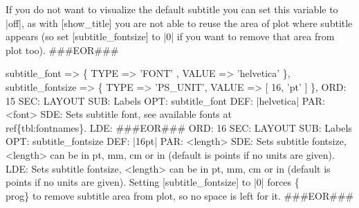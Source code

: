 \documentclass[11pt]{article}
\def\nwendcode{\endtrivlist \endgroup} %
\let\nwdocspar=\par                    %
\begin{document}
If you do not want to visualize the default subtitle you can set this
variable to |off|, as with [show_title] you are not able to reuse the area 
of plot where subtitle appears (so set [subtitle_fontsize] to |0| if you 
want to remove that area from plot too).
###EOR###
\nwendcode{}\nwdocspar
\nwenddocs{}\plusendmoddef
subtitle_font              => \{ TYPE => 'FONT'   , VALUE => 'helvetica'   \},
subtitle_fontsize          => \{ TYPE => 'PS_UNIT', VALUE => [ 16, 'pt' ]  \},
\eatline
{}\nwendcode{}\plusendmoddef
ORD: 15
SEC: LAYOUT
SUB: Labels
OPT: subtitle_font
DEF: |helvetica|
PAR: <font>
SDE: Sets subtitle font, see available fonts at~\\ref\{tbl:fontnames\}.
LDE: 
###EOR###
ORD: 16
SEC: LAYOUT
SUB: Labels
OPT: subtitle_fontsize
DEF: |16pt|
PAR: <length>
SDE: Sets subtitle fontsize, <length> can be in pt, mm, cm or in (default is points if no units are given).
LDE:
Sets subtitle fontsize, <length> can be in pt, mm, cm or in 
(default is points if no units are given).
Setting [subtitle_fontsize] to |0| forces \{\\prog\} to remove
subtitle area from plot, so no space is left for it.
###EOR###
\nwendcode{}\nwdocspar
\end{document}
